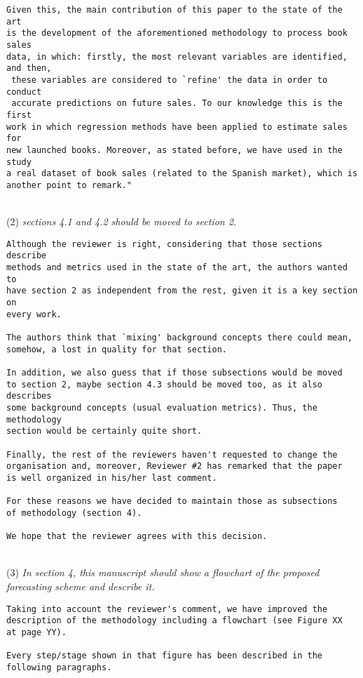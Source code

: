 \documentclass[preprint]{elsarticle}
\begin{document}
\begin{verbatim}
Given this, the main contribution of this paper to the state of the art 
is the development of the aforementioned methodology to process book sales 
data, in which: firstly, the most relevant variables are identified, and then,
 these variables are considered to `refine' the data in order to conduct
 accurate predictions on future sales. To our knowledge this is the first 
work in which regression methods have been applied to estimate sales for 
new launched books. Moreover, as stated before, we have used in the study 
a real dataset of book sales (related to the Spanish market), which is 
another point to remark."

\end{verbatim}


~\\
\noindent (2) \emph{sections 4.1 and 4.2 should be moved to section 2. } 

\begin{verbatim}
Although the reviewer is right, considering that those sections describe 
methods and metrics used in the state of the art, the authors wanted to 
have section 2 as independent from the rest, given it is a key section on 
every work. 

The authors think that `mixing' background concepts there could mean, 
somehow, a lost in quality for that section.

In addition, we also guess that if those subsections would be moved 
to section 2, maybe section 4.3 should be moved too, as it also describes 
some background concepts (usual evaluation metrics). Thus, the methodology 
section would be certainly quite short.

Finally, the rest of the reviewers haven't requested to change the 
organisation and, moreover, Reviewer #2 has remarked that the paper 
is well organized in his/her last comment.

For these reasons we have decided to maintain those as subsections 
of methodology (section 4).

We hope that the reviewer agrees with this decision.
\end{verbatim}


~\\
\noindent (3) \emph{In section 4, this manuscript should show a flowchart of the proposed forecasting scheme and describe it. } 

\begin{verbatim}
Taking into account the reviewer's comment, we have improved the 
description of the methodology including a flowchart (see Figure XX 
at page YY).

Every step/stage shown in that figure has been described in the 
following paragraphs.
\end{verbatim}
\end{document}
